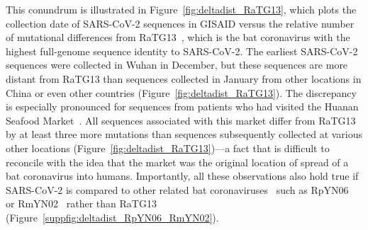 \documentclass[9pt,twocolumn,twoside]{gsajnl_modified}
\begin{document}
This conundrum is illustrated in Figure~\ref{fig:deltadist_RaTG13}, which plots the collection date of SARS-CoV-2 sequences in GISAID versus the relative number of mutational differences from RaTG13~\citep{zhou2020pneumonia}, which is the bat coronavirus with the highest full-genome sequence identity to SARS-CoV-2.
The earliest SARS-CoV-2 sequences were collected in Wuhan in December, but these sequences are more distant from RaTG13 than sequences collected in January from other locations in China or even other countries (Figure~\ref{fig:deltadist_RaTG13}).
The discrepancy is especially pronounced for sequences from patients who had visited the Huanan Seafood Market~\citep{WHO2021origins}.
All sequences associated with this market differ from RaTG13 by at least three more mutations than sequences subsequently collected at various other locations (Figure~\ref{fig:deltadist_RaTG13})---a fact that is difficult to reconcile with the idea that the market was the original location of spread of a bat coronavirus into humans.
Importantly, all these observations also hold true if SARS-CoV-2 is compared to other related bat coronaviruses~\citep{lytras2021exploring} such as RpYN06~\citep{zhou2021identification} or RmYN02~\citep{zhou2020novel} rather than RaTG13 (Figure~\ref{suppfig:deltadist_RpYN06_RmYN02}).
\end{document}
